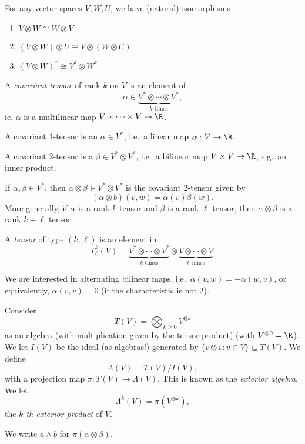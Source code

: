 \documentclass[a4paper]{article}
\begin{document}
\begin{prop}
  For any vector spaces $V, W, U$, we have (natural) isomorphisms
  \begin{enumerate}
    \item $V \otimes W \cong W \otimes V$
    \item $(V \otimes W) \otimes U \cong V \otimes (W \otimes U)$
    \item $(V \otimes W)^* \cong V^* \otimes W^*$
  \end{enumerate}
\end{prop}

\begin{defi}
  A \emph{covariant tensor} of rank $k$ on $V$ is an element of
  \[
    \alpha \in \underbrace{V^* \otimes \cdots \otimes V^*}_{k\text{ times}},
  \]
  ie. $\alpha$ is a multilinear map $V \times \cdots \times V \to \R$.
\end{defi}

\begin{eg}
  A covariant $1$-tensor is an $\alpha \in V^*$, i.e.\ a linear map $\alpha: V \to \R$.

  A covariant $2$-tensor is a $\beta \in V^* \otimes V^*$, i.e.\ a bilinear map $V \times V \to \R$, e.g.\ an inner product.
\end{eg}

\begin{eg}
  If $\alpha, \beta \in V^*$, then $\alpha \otimes \beta \in V^* \otimes V^*$ is the covariant $2$-tensor given by
  \[
    (\alpha \otimes b)(v, w) = \alpha(v) \beta(w).
  \]
  More generally, if $\alpha$ is a rank $k$ tensor and $\beta$ is a rank $\ell$ tensor, then $\alpha \otimes \beta$ is a rank $k + \ell$ tensor.
\end{eg}

\begin{defi}[Tensor]
  A \emph{tensor} of type $(k, \ell)$ is an element in
  \[
    T^k_\ell(V) = \underbrace{V^* \otimes \cdots \otimes V^*}_{k\text{ times}} \otimes \underbrace{V \otimes \cdots \otimes V}_{\ell\text{ times}}.
  \]
\end{defi}
We are interested in alternating bilinear maps, i.e.\ $\alpha(v, w) = - \alpha(w, v)$, or equivalently, $\alpha(v, v) = 0$ (if the characteristic is not $2$).

\begin{defi}
  Consider
  \[
    T(V) = \bigotimes_{k \geq 0} V^{\otimes k}
  \]
  as an algebra (with multiplication given by the tensor product) (with $V^{\otimes 0} = \R$). We let $I(V)$ be the ideal (as algebras!) generated by $\{v \otimes v: v \in V\} \subseteq T(V)$. We define
  \[
    \Lambda (V) = T(V)/I(V),
  \]
  with a projection map $\pi: T(V) \to \Lambda(V)$. This is known as the \emph{exterior algebra}. We let
  \[
    \Lambda^k(V) = \pi(V^{\otimes k}),
  \]
  the \emph{$k$-th exterior product} of $V$.

  We write $a \wedge b$ for $\pi(\alpha \otimes \beta)$.
\end{defi}
\end{document}
